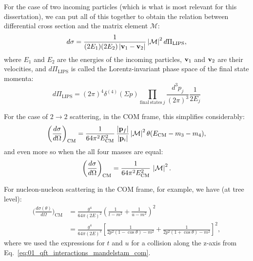 For the case of two incoming particles (which is what is most relevant for this dissertation), we can put all of this together to obtain the relation between differential cross section and the matrix element $\mathcal M$:
\begin{equation}
	\label{eq:01_qft_interactions_cross_section_matrix_element}
	d\sigma = \frac{1}{(2E_1)(2E_2)\left\lvert \mathbf{v}_1 - \mathbf{v}_2 \right\rvert} \left\lvert \mathcal M \right\rvert^2 d\Pi_{\mathrm{LIPS}},
\end{equation}
where $E_1$ and $E_2$ are the energies of the incoming particles, $\mathbf{v}_1$ and $\mathbf{v}_2$ are their velocities, and $d\Pi_{\mathrm{LIPS}}$ is called the Lorentz-invariant phase space of the final state momenta:
\begin{equation}
	\label{eq:01_qft_interactions_cross_section_lips}
	d\Pi_{\mathrm{LIPS}} = (2\pi)^4 \delta^{(4)}(\Sigma p) \prod_{\mathrm{final\ states}\ j} \frac{d^3p_j}{(2\pi)^3} \frac{1}{2E_j}
\end{equation}

For the case of $2 \rightarrow 2$ scattering, in the COM frame, this simplifies considerably:
\begin{equation}
	\label{eq:01_qft_interactions_cross_section_com}
	\bigg(\frac{d\sigma}{d\Omega}\bigg)_{\mathrm{CM}} = \frac{1}{64\pi^2E_{\mathrm{CM}}^2}\, \frac{\left\lvert \mathbf{p}_f \right\rvert}{\left\lvert \mathbf{p}_i \right\rvert} \left\lvert \mathcal M \right\rvert^2 \theta(E_{\mathrm{CM}} - m_3 - m_4),
\end{equation}
and even more so when the all four masses are equal:
\begin{equation}
	\label{eq:01_qft_interactions_cross_section_com_equal_mass}
	\bigg(\frac{d\sigma}{d\Omega}\bigg)_{\mathrm{CM}} = \frac{1}{64\pi^2E_{\mathrm{CM}}^2}\, \left\lvert \mathcal M \right\rvert^2.
\end{equation}

For nucleon-nucleon scattering in the COM frame, for example, we have (at tree level):
\begin{equation}
	\label{eq:01_qft_interactions_nn_scattering_cross_section}
	\begin{split}
		\bigg(\frac{d\sigma(\theta)}{d\Omega}\bigg)_{\mathrm{CM}} &= \frac{g^4}{64\pi (2E)^2} \left(\frac{1}{t - m^2} + \frac{1}{u - m^2}\right)^2 \\
		&= \frac{g^4}{64\pi (2E)^2} \left[\frac{1}{2p^2(1 - \cos\theta) - m^2} + \frac{1}{2p^2(1 + \cos\theta) - m^2}\right]^2,
	\end{split}
\end{equation}
where we used the expressions for $t$ and $u$ for a collision along the z-axis from Eq.~\ref{eq:01_qft_interactions_mandelstam_com}.

